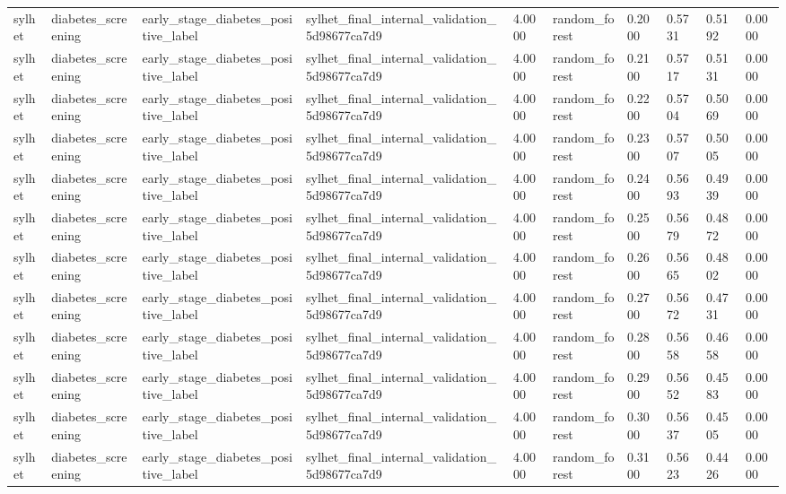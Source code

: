 \begin{tabular}{llllllllll}
sylhet & diabetes\_screening & early\_stage\_diabetes\_positive\_label & sylhet\_final\_internal\_validation\_5d98677ca7d9 & 4.0000 & random\_forest & 0.2000 & 0.5731 & 0.5192 & 0.0000 \\
sylhet & diabetes\_screening & early\_stage\_diabetes\_positive\_label & sylhet\_final\_internal\_validation\_5d98677ca7d9 & 4.0000 & random\_forest & 0.2100 & 0.5717 & 0.5131 & 0.0000 \\
sylhet & diabetes\_screening & early\_stage\_diabetes\_positive\_label & sylhet\_final\_internal\_validation\_5d98677ca7d9 & 4.0000 & random\_forest & 0.2200 & 0.5704 & 0.5069 & 0.0000 \\
sylhet & diabetes\_screening & early\_stage\_diabetes\_positive\_label & sylhet\_final\_internal\_validation\_5d98677ca7d9 & 4.0000 & random\_forest & 0.2300 & 0.5707 & 0.5005 & 0.0000 \\
sylhet & diabetes\_screening & early\_stage\_diabetes\_positive\_label & sylhet\_final\_internal\_validation\_5d98677ca7d9 & 4.0000 & random\_forest & 0.2400 & 0.5693 & 0.4939 & 0.0000 \\
sylhet & diabetes\_screening & early\_stage\_diabetes\_positive\_label & sylhet\_final\_internal\_validation\_5d98677ca7d9 & 4.0000 & random\_forest & 0.2500 & 0.5679 & 0.4872 & 0.0000 \\
sylhet & diabetes\_screening & early\_stage\_diabetes\_positive\_label & sylhet\_final\_internal\_validation\_5d98677ca7d9 & 4.0000 & random\_forest & 0.2600 & 0.5665 & 0.4802 & 0.0000 \\
sylhet & diabetes\_screening & early\_stage\_diabetes\_positive\_label & sylhet\_final\_internal\_validation\_5d98677ca7d9 & 4.0000 & random\_forest & 0.2700 & 0.5672 & 0.4731 & 0.0000 \\
sylhet & diabetes\_screening & early\_stage\_diabetes\_positive\_label & sylhet\_final\_internal\_validation\_5d98677ca7d9 & 4.0000 & random\_forest & 0.2800 & 0.5658 & 0.4658 & 0.0000 \\
sylhet & diabetes\_screening & early\_stage\_diabetes\_positive\_label & sylhet\_final\_internal\_validation\_5d98677ca7d9 & 4.0000 & random\_forest & 0.2900 & 0.5652 & 0.4583 & 0.0000 \\
sylhet & diabetes\_screening & early\_stage\_diabetes\_positive\_label & sylhet\_final\_internal\_validation\_5d98677ca7d9 & 4.0000 & random\_forest & 0.3000 & 0.5637 & 0.4505 & 0.0000 \\
sylhet & diabetes\_screening & early\_stage\_diabetes\_positive\_label & sylhet\_final\_internal\_validation\_5d98677ca7d9 & 4.0000 & random\_forest & 0.3100 & 0.5623 & 0.4426 & 0.0000 \\

\end{tabular}
